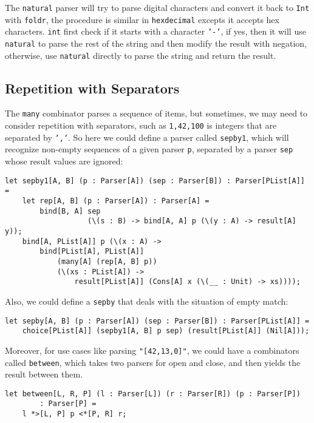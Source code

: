 The \texttt{natural} parser will try to parse digital characters and convert it back to \texttt{Int} with \texttt{foldr}, the procedure is similar in \texttt{hexdecimal} excepts it accepts hex characters. \texttt{int} first check if it starts with a character \texttt{'-'}, if yes, then it will use \texttt{natural} to parse the rest of the string and then modify the result with negation, otherwise, use \texttt{natural} directly to parse the string and return the result.

\subsection{Repetition with Separators}

The \texttt{many} combinator parses a sequence of items, but sometimes, we may need to consider repetition with separators, such as \texttt{1,42,100} is integers that are separated by \texttt{','}. So here we could define a parser called \texttt{sepby1}, which will recognize non-empty sequences of a given parser \texttt{p}, separated by a parser \texttt{sep} whose result values are ignored:

\begin{lstlisting}
let sepby1[A, B] (p : Parser[A]) (sep : Parser[B]) : Parser[PList[A]] =
    let rep[A, B] (p : Parser[A]) : Parser[A] =
        bind[B, A] sep
                   (\(s : B) -> bind[A, A] p (\(y : A) -> result[A] y));
    bind[A, PList[A]] p (\(x : A) ->
        bind[PList[A], PList[A]]
            (many[A] (rep[A, B] p))
            (\(xs : PList[A]) ->
                result[PList[A]] (Cons[A] x (\(__ : Unit) -> xs))));
\end{lstlisting}

Also, we could define a \texttt{sepby} that deals with the situation of empty match:

\begin{lstlisting}
let sepby[A, B] (p : Parser[A]) (sep : Parser[B]) : Parser[PList[A]] =
    choice[PList[A]] (sepby1[A, B] p sep) (result[PList[A]] (Nil[A]));
\end{lstlisting}

Moreover, for use cases like parsing \texttt{"[42,13,0]"}, we could have a combinators called \texttt{between}, which takes two parsers for open and close, and then yields the result between them.

\begin{lstlisting}
let between[L, R, P] (l : Parser[L]) (r : Parser[R]) (p : Parser[P])
        : Parser[P] =
    l *>[L, P] p <*[P, R] r;
\end{lstlisting}

